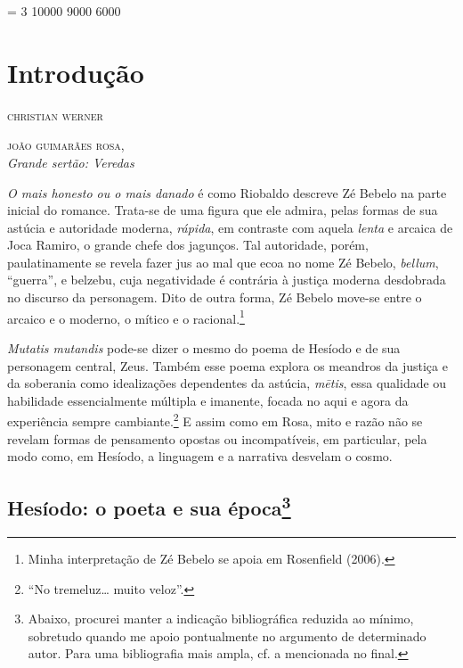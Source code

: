 \begingroup\widowpenalties = 3 10000 9000 6000
\chapter*{Introdução\smallskip{}}

\begin{flushright}
\textsc{christian werner}
\end{flushright}

\setlength{\epigraphwidth}{.65\textwidth}
\begin{epigraphs} 
{\textsc{joão guimarães rosa},\\
\textit{Grande sertão: Veredas}}
\end{epigraphs}

\noindent{}\textit{O mais honesto ou o mais danado} é como Riobaldo descreve Zé
Bebelo na parte inicial do romance. Trata-se de uma figura que ele
admira, pelas formas de sua astúcia e autoridade moderna, \textit{rápida}, em
contraste com aquela \textit{lenta} e arcaica de Joca Ramiro, o grande chefe
dos jagunços. Tal autoridade, porém, paulatinamente se revela fazer jus
ao mal que ecoa no nome Zé Bebelo, \textit{bellum}, ``guerra'', e belzebu,
cuja negatividade é contrária à justiça moderna desdobrada no discurso
da personagem. Dito de outra forma, Zé Bebelo move-se entre o arcaico e
o moderno, o mítico e o racional.\footnote{Minha interpretação de Zé
  Bebelo se apoia em Rosenfield (2006).}

\textit{Mutatis mutandis} pode-se dizer o mesmo do poema de Hesíodo e de
sua personagem central, Zeus. Também esse poema explora os meandros da
justiça e da soberania como idealizações dependentes da astúcia, \textit{mētis}, essa qualidade ou habilidade essencialmente múltipla e
imanente, focada no aqui e agora da experiência sempre cambiante.\footnote{``No
tremeluz\ldots{} muito veloz''.} E assim como em Rosa, mito e razão não
se revelam formas de pensamento opostas ou incompatíveis, em particular,
pela modo como, em Hesíodo, a linguagem e a narrativa desvelam o cosmo.

\section{Hesíodo: o poeta e sua época\protect\footnote{\MakeUppercase{A}baixo, procurei manter a
  indicação bibliográfica reduzida ao mínimo, sobretudo quando me apoio
  pontualmente no argumento de determinado autor. \MakeUppercase{P}ara uma bibliografia
  mais ampla, cf. a mencionada no final.}}

